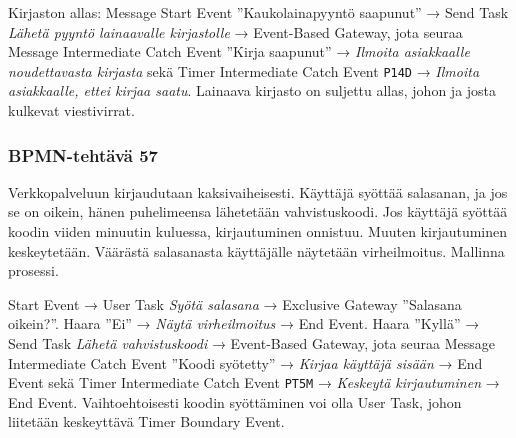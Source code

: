 \documentclass[
  finnish,
  letterpaper,
  DIV=11,
  numbers=noendperiod,
  oneside]{scrreprt}
\begin{document}
\begin{tcolorbox}[enhanced jigsaw, arc=.35mm, bottomrule=.15mm, bottomtitle=1mm, breakable, colback=white, colbacktitle=quarto-callout-tip-color!10!white, colframe=quarto-callout-tip-color-frame, coltitle=black, left=2mm, leftrule=.75mm, opacityback=0, opacitybacktitle=0.6, rightrule=.15mm, title=\textcolor{quarto-callout-tip-color}{\faLightbulb}\hspace{0.5em}{Malliratkaisu}, titlerule=0mm, toprule=.15mm, toptitle=1mm]

Kirjaston allas: Message Start Event ''Kaukolainapyyntö saapunut'' →
Send Task \emph{Lähetä pyyntö lainaavalle kirjastolle} → Event-Based
Gateway, jota seuraa Message Intermediate Catch Event ''Kirja saapunut''
→ \emph{Ilmoita asiakkaalle noudettavasta kirjasta} sekä Timer
Intermediate Catch Event \texttt{P14D} → \emph{Ilmoita asiakkaalle,
ettei kirjaa saatu}. Lainaava kirjasto on suljettu allas, johon ja josta
kulkevat viestivirrat.

\end{tcolorbox}

\subsubsection{BPMN-tehtävä 57}\label{bpmn-tehtuxe4vuxe4-57}

Verkkopalveluun kirjaudutaan kaksivaiheisesti. Käyttäjä syöttää
salasanan, ja jos se on oikein, hänen puhelimeensa lähetetään
vahvistuskoodi. Jos käyttäjä syöttää koodin viiden minuutin kuluessa,
kirjautuminen onnistuu. Muuten kirjautuminen keskeytetään. Väärästä
salasanasta käyttäjälle näytetään virheilmoitus. Mallinna prosessi.

\begin{tcolorbox}[enhanced jigsaw, arc=.35mm, bottomrule=.15mm, bottomtitle=1mm, breakable, colback=white, colbacktitle=quarto-callout-tip-color!10!white, colframe=quarto-callout-tip-color-frame, coltitle=black, left=2mm, leftrule=.75mm, opacityback=0, opacitybacktitle=0.6, rightrule=.15mm, title=\textcolor{quarto-callout-tip-color}{\faLightbulb}\hspace{0.5em}{Malliratkaisu}, titlerule=0mm, toprule=.15mm, toptitle=1mm]

Start Event → User Task \emph{Syötä salasana} → Exclusive Gateway
''Salasana oikein?''. Haara ''Ei'' → \emph{Näytä virheilmoitus} → End
Event. Haara ''Kyllä'' → Send Task \emph{Lähetä vahvistuskoodi} →
Event-Based Gateway, jota seuraa Message Intermediate Catch Event
''Koodi syötetty'' → \emph{Kirjaa käyttäjä sisään} → End Event sekä
Timer Intermediate Catch Event \texttt{PT5M} → \emph{Keskeytä
kirjautuminen} → End Event. Vaihtoehtoisesti koodin syöttäminen voi olla
User Task, johon liitetään keskeyttävä Timer Boundary Event.

\end{tcolorbox}
\end{document}
